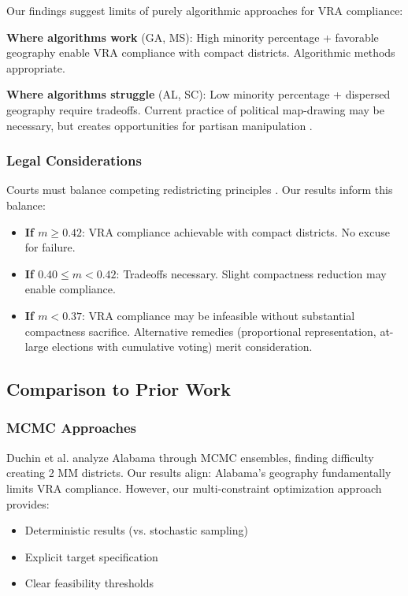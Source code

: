 Our findings suggest limits of purely algorithmic approaches for VRA compliance:

\textbf{Where algorithms work} (GA, MS): High minority percentage + favorable geography enable VRA compliance with compact districts. Algorithmic methods appropriate.

\textbf{Where algorithms struggle} (AL, SC): Low minority percentage + dispersed geography require tradeoffs. Current practice of political map-drawing may be necessary, but creates opportunities for partisan manipulation \citep{stephanopoulos2015}.

\subsubsection{Legal Considerations}

Courts must balance competing redistricting principles \citep{pildes2002}. Our results inform this balance:

\begin{itemize}
\item \textbf{If $m \geq 0.42$}: VRA compliance achievable with compact districts. No excuse for failure.
\item \textbf{If $0.40 \leq m < 0.42$}: Tradeoffs necessary. Slight compactness reduction may enable compliance.
\item \textbf{If $m < 0.37$}: VRA compliance may be infeasible without substantial compactness sacrifice. Alternative remedies (proportional representation, at-large elections with cumulative voting) merit consideration.
\end{itemize}

\subsection{Comparison to Prior Work}

\subsubsection{MCMC Approaches}

Duchin et al. \citep{duchin2020alabama} analyze Alabama through MCMC ensembles, finding difficulty creating 2 MM districts. Our results align: Alabama's geography fundamentally limits VRA compliance. However, our multi-constraint optimization approach provides:
\begin{itemize}
\item Deterministic results (vs. stochastic sampling)
\item Explicit target specification
\item Clear feasibility thresholds
\end{itemize}

